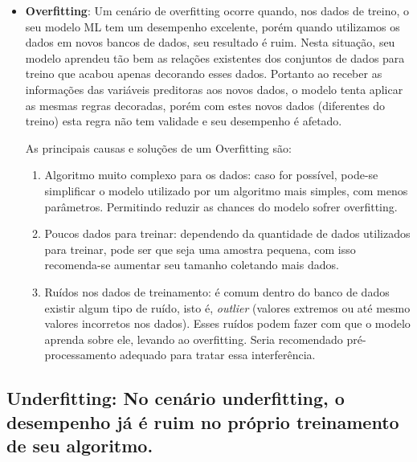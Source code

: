 \documentclass[
]{book}
\begin{document}
\begin{itemize}
\item
  \textbf{Overfitting}: Um cenário de overfitting ocorre quando, nos dados de treino, o seu modelo ML tem um desempenho excelente, porém quando utilizamos os dados em novos bancos de dados, seu resultado é ruim. Nesta situação, seu modelo aprendeu tão bem as relações existentes dos conjuntos de dados para treino que acabou apenas decorando esses dados. Portanto ao receber as informações das variáveis preditoras aos novos dados, o modelo tenta aplicar as mesmas regras decoradas, porém com estes novos dados (diferentes do treino) esta regra não tem validade e seu desempenho é afetado.

  As principais causas e soluções de um Overfitting são:

  \begin{enumerate}
  \def\labelenumi{\arabic{enumi}.}
  \item
    Algoritmo muito complexo para os dados: caso for possível, pode-se simplificar o modelo utilizado por um algoritmo mais simples, com menos parâmetros. Permitindo reduzir as chances do modelo sofrer overfitting.
  \item
    Poucos dados para treinar: dependendo da quantidade de dados utilizados para treinar, pode ser que seja uma amostra pequena, com isso recomenda-se aumentar seu tamanho coletando mais dados.
  \item
    Ruídos nos dados de treinamento: é comum dentro do banco de dados existir algum tipo de ruído, isto é, \emph{outlier} (valores extremos ou até mesmo valores incorretos nos dados). Esses ruídos podem fazer com que o modelo aprenda sobre ele, levando ao overfitting. Seria recomendado pré-processamento adequado para tratar essa interferência.
  \end{enumerate}
\end{itemize}

\hypertarget{underfitting-no-cenuxe1rio-underfitting-o-desempenho-juxe1-uxe9-ruim-no-pruxf3prio-treinamento-de-seu-algoritmo.}{%
\subsection{\texorpdfstring{\textbf{Underfitting}: No cenário underfitting, o desempenho já é ruim no próprio treinamento de seu algoritmo.}{Underfitting: No cenário underfitting, o desempenho já é ruim no próprio treinamento de seu algoritmo.}}\label{underfitting-no-cenuxe1rio-underfitting-o-desempenho-juxe1-uxe9-ruim-no-pruxf3prio-treinamento-de-seu-algoritmo.}}
\end{document}
